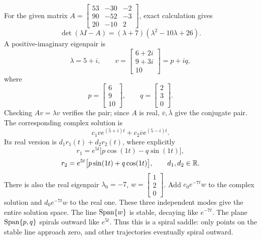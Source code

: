 For the given matrix $A=\left[\begin{matrix}53 & -30 & -2\\90 & -52 & -3\\20 & -10 & 2\end{matrix}\right]$, exact calculation gives
\[\det(\lambda I-A)=\left(\lambda + 7\right) \left(\lambda^{2} - 10 \lambda + 26\right).\]
A positive-imaginary eigenpair is
\[\lambda=5 + i,\qquad v=\left[\begin{matrix}6 + 2 i\\9 + 3 i\\10\end{matrix}\right]=p+iq,\]
where
\[p=\left[\begin{matrix}6\\9\\10\end{matrix}\right],\qquad q=\left[\begin{matrix}2\\3\\0\end{matrix}\right].\]
Checking $Av=\lambda v$ verifies the pair; since $A$ is real,
$\overline v,\overline\lambda$ give the conjugate pair.
The corresponding complex solution is
\[c_1ve^{(5 + i)t}+c_2\overline v e^{(5 - i)t}.
\]
Its real version is $d_1r_1(t)+d_2r_2(t)$, where explicitly
\[r_1=e^{5t}\bigl[p\cos(1t)-q\sin(1t)\bigr],\]
\[r_2=e^{5t}\bigl[p\sin(1t)+q\cos(1t)\bigr],\qquad d_1,d_2\in\mathbb{R}.\]
There is also the real eigenpair $\lambda_0=-7$,
$w=\left[\begin{matrix}1\\2\\0\end{matrix}\right]$. Add $c_0e^{-7t}w$ to the
complex solution and $d_0e^{-7t}w$ to the real one.
These three independent modes give the entire solution space.
The line $\operatorname{Span}\{w\}$ is stable, decaying like $e^{-7t}$.
The plane $\operatorname{Span}\{p,q\}$ spirals outward like $e^{5t}$.
Thus this is a spiral saddle: only points on the stable line approach
zero, and other trajectories eventually spiral outward.


